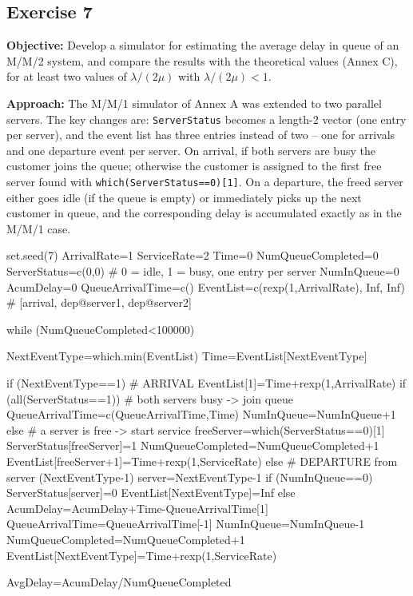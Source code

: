\documentclass[12pt]{article}
\begin{document}
\subsection{Exercise 7}

\textbf{Objective:} Develop a simulator for estimating the average delay in queue of an M/M/2 system, and compare the results with the theoretical values (Annex C), for at least two values of $\lambda/(2\mu)$ with $\lambda/(2\mu)<1$.

\textbf{Approach:} The M/M/1 simulator of Annex A was extended to two parallel servers. The key changes are: \texttt{ServerStatus} becomes a length-2 vector (one entry per server), and the event list has three entries instead of two -- one for arrivals and one departure event per server. On arrival, if both servers are busy the customer joins the queue; otherwise the customer is assigned to the first free server found with \texttt{which(ServerStatus==0)[1]}. On a departure, the freed server either goes idle (if the queue is empty) or immediately picks up the next customer in queue, and the corresponding delay is accumulated exactly as in the M/M/1 case.

\begin{configbox}
set.seed(7)
ArrivalRate=1
ServiceRate=2
Time=0
NumQueueCompleted=0
ServerStatus=c(0,0)          # 0 = idle, 1 = busy, one entry per server
NumInQueue=0
AcumDelay=0
QueueArrivalTime=c()
EventList=c(rexp(1,ArrivalRate), Inf, Inf)  # [arrival, dep@server1, dep@server2]

while (NumQueueCompleted<100000) {
  NextEventType=which.min(EventList)
  Time=EventList[NextEventType]

  if (NextEventType==1) {                    # ARRIVAL
    EventList[1]=Time+rexp(1,ArrivalRate)
    if (all(ServerStatus==1)) {               # both servers busy -> join queue
      QueueArrivalTime=c(QueueArrivalTime,Time)
      NumInQueue=NumInQueue+1
    } else {                                  # a server is free -> start service
      freeServer=which(ServerStatus==0)[1]
      ServerStatus[freeServer]=1
      NumQueueCompleted=NumQueueCompleted+1
      EventList[freeServer+1]=Time+rexp(1,ServiceRate)
    }
  } else {                                    # DEPARTURE from server (NextEventType-1)
    server=NextEventType-1
    if (NumInQueue==0) {
      ServerStatus[server]=0
      EventList[NextEventType]=Inf
    } else {
      AcumDelay=AcumDelay+Time-QueueArrivalTime[1]
      QueueArrivalTime=QueueArrivalTime[-1]
      NumInQueue=NumInQueue-1
      NumQueueCompleted=NumQueueCompleted+1
      EventList[NextEventType]=Time+rexp(1,ServiceRate)
    }
  }
}

AvgDelay=AcumDelay/NumQueueCompleted
\end{configbox}
\end{document}
